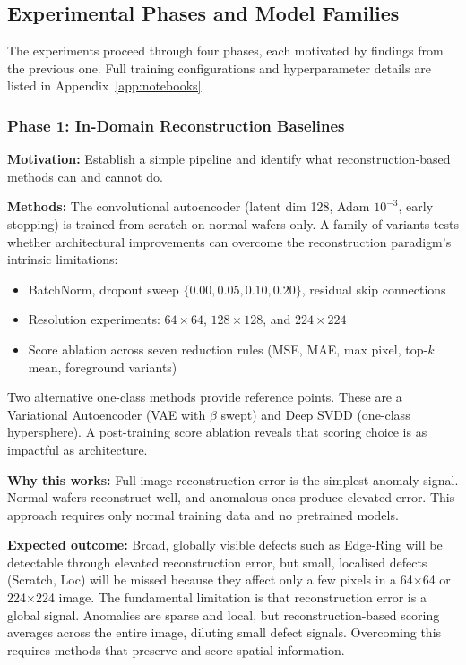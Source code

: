 \documentclass[11pt]{article}
\begin{document}
\subsection{Experimental Phases and Model Families}

The experiments proceed through four phases, each motivated by findings from the previous one.
Full training configurations and hyperparameter details are listed in Appendix~\ref{app:notebooks}.

\subsubsection{Phase 1: In-Domain Reconstruction Baselines}

\textbf{Motivation:} Establish a simple pipeline and identify what reconstruction-based
methods can and cannot do.

\textbf{Methods:} The convolutional autoencoder (latent dim 128, Adam $10^{-3}$, early stopping)
is trained from scratch on normal wafers only. A family of variants tests whether architectural
improvements can overcome the reconstruction paradigm's intrinsic limitations:
\begin{itemize}[leftmargin=1.5em]
  \item BatchNorm, dropout sweep $\{0.00, 0.05, 0.10, 0.20\}$, residual skip connections
  \item Resolution experiments: $64\!\times\!64$, $128\!\times\!128$, and $224\!\times\!224$
  \item Score ablation across seven reduction rules (MSE, MAE, max pixel, top-$k$ mean, foreground variants)
\end{itemize}
Two alternative one-class methods provide reference points. These are a Variational Autoencoder (VAE with $\beta$ swept)
and Deep SVDD (one-class hypersphere). A post-training score ablation reveals that scoring choice is
as impactful as architecture.

\textbf{Why this works:} Full-image reconstruction error is the simplest anomaly signal. Normal wafers
reconstruct well, and anomalous ones produce elevated error. This approach requires only normal training data and no pretrained models.

\textbf{Expected outcome:} Broad, globally visible defects such as Edge-Ring will be detectable through
elevated reconstruction error, but small, localised defects (Scratch, Loc) will be missed because they affect
only a few pixels in a 64$\times$64 or 224$\times$224 image. The fundamental limitation is that reconstruction error is a global signal.
Anomalies are sparse and local, but reconstruction-based scoring averages across the entire image, diluting
small defect signals. Overcoming this requires methods that preserve and score spatial information.
\end{document}
